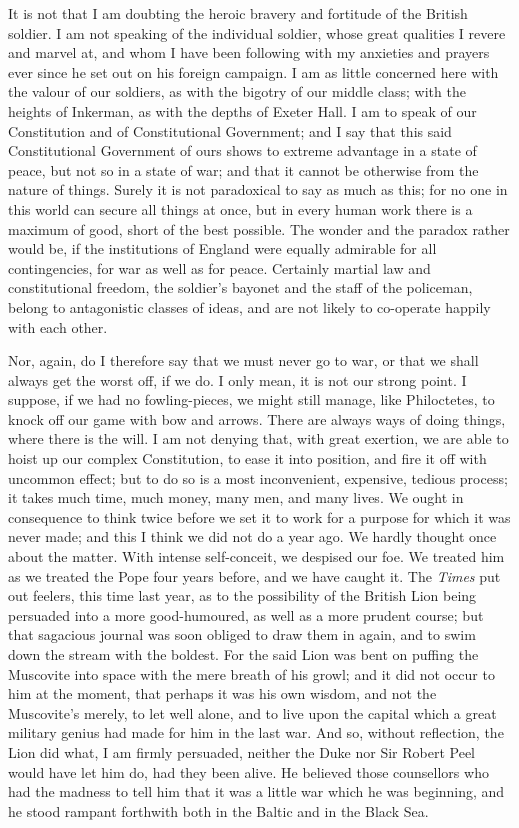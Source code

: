 It is not that I am doubting the heroic bravery
and fortitude of the British soldier. I am not speaking of the
individual soldier, whose great qualities I revere and marvel at, and
whom I have been following with my anxieties and prayers ever since he
set out on his foreign campaign. I am as little concerned here
with the valour of our soldiers, as with the bigotry of our middle
class; with the heights of Inkerman, as with the depths of Exeter Hall.
I am to speak of our Constitution and of Constitutional Government;
and I say that this said Constitutional Government of ours shows to
extreme advantage in a state of peace, but not so in a state of war;
and that it cannot be otherwise from the nature of things. Surely it
is not paradoxical to say as much as this; for no one in this world
can secure all things at once, but in every human work there is a
maximum of good, short of the best possible. The wonder and the
paradox rather would be, if the institutions of England were equally
admirable for all contingencies, for war as well as for peace.
Certainly martial law and constitutional freedom, the soldier's
bayonet and the staff of the policeman, belong to antagonistic classes
of ideas, and are not likely to co-operate happily with each other.

Nor, again, do I therefore say that we must never
go to war, or that we shall always get the worst off, if we do. I only
mean, it is not our strong point. I suppose, if we had no
fowling-pieces, we might still manage, like Philoctetes, to knock off
our game with bow and arrows. There are always ways of doing things,
where there is the will. I am not denying that, with great exertion,
we are able to hoist up our complex Constitution, to ease it into
position, and fire it off with uncommon effect; but to do so is a most
inconvenient, expensive, tedious process; it takes much time, much
money, many men, and many lives. We ought in consequence to think
twice before we set it to work for a purpose for which it was never
made; and this I think we did not do a year ago. We hardly thought
once about the matter. With intense self-conceit, we despised our foe.
We treated him as we treated the Pope four years before, and we
have caught it. The \emph{Times} put out feelers, this time last year,
as to the possibility of the British Lion being persuaded into a more
good-humoured, as well as a more prudent course; but that sagacious
journal was soon obliged to draw them in again, and to swim down the
stream with the boldest. For the said Lion was bent on puffing the
Muscovite into space with the mere breath of his growl; and it did not
occur to him at the moment, that perhaps it was his own wisdom, and
not the Muscovite's merely, to let well alone, and to live upon the
capital which a great military genius had made for him in the last
war. And so, without reflection, the Lion did what, I am firmly
persuaded, neither the Duke nor Sir Robert Peel would have let him do,
had they been alive. He believed those counsellors who had the madness
to tell him that it was a little war which he was beginning, and he
stood rampant forthwith both in the Baltic and in the Black Sea.

